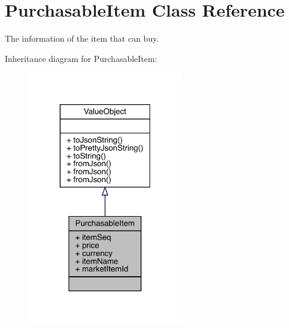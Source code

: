 \hypertarget{classcom_1_1toast_1_1android_1_1gamebase_1_1base_1_1purchase_1_1_purchasable_item}{}\section{Purchasable\+Item Class Reference}
\label{classcom_1_1toast_1_1android_1_1gamebase_1_1base_1_1purchase_1_1_purchasable_item}


The information of the item that can buy.  




Inheritance diagram for Purchasable\+Item\+:
\nopagebreak
\begin{figure}[H]
\begin{center}
\leavevmode
\includegraphics[width=193pt]{classcom_1_1toast_1_1android_1_1gamebase_1_1base_1_1purchase_1_1_purchasable_item__inherit__graph}
\end{center}
\end{figure}


